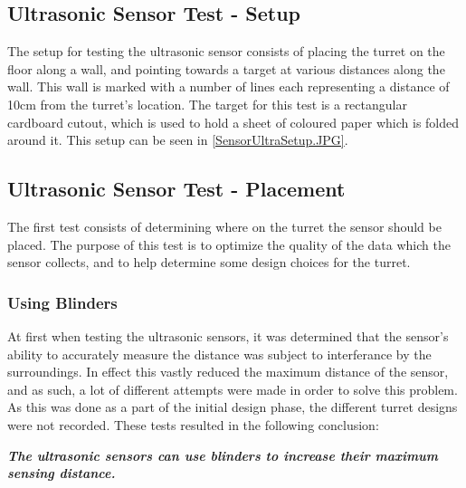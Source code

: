 \subsection{Ultrasonic Sensor Test - Setup}\label{UltraTestSetup}
The setup for testing the ultrasonic sensor consists of placing the turret on
the floor along a wall, and pointing towards a target at various distances along
the wall. This wall is marked with a number of lines each representing a
distance of 10cm from the turret's location. The target for this test is a
rectangular cardboard cutout, which is used to hold a sheet of coloured paper
which is folded around it. This setup can be seen in
\autoref{SensorUltraSetup.JPG}.


\subsection{Ultrasonic Sensor Test - Placement}\label{UltraTestPlacement}
The first test consists of determining where on the turret the sensor should be
placed. The purpose of this test is to optimize the quality of the data which
the sensor collects, and to help determine some design choices for the
turret.\nl


\subsubsection{Using Blinders}
At first when testing the ultrasonic sensors, it was determined that the
sensor's ability to accurately measure the distance was subject to interferance
by the surroundings. In effect this vastly reduced the maximum distance of the
sensor, and as such, a lot of different attempts were made in order to solve
this problem. As this was done as a part of the initial design phase, the
different turret designs were not recorded. These tests resulted in the
following conclusion:\nl

\textit{\textbf{The ultrasonic sensors can use blinders to increase their
maximum sensing distance.}}\nl

